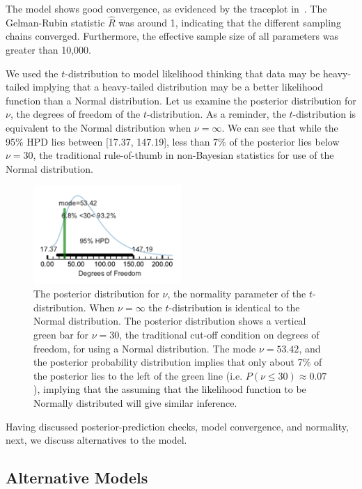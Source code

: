 The model shows good convergence, as evidenced by the traceplot in~. The Gelman-Rubin statistic $\hat{R}$ was around 1, indicating that the different sampling chains converged. Furthermore, the effective sample size of all parameters was greater than 10,000.

We used the $t$-distribution to model likelihood thinking that data may be heavy-tailed implying that a heavy-tailed distribution may be a better likelihood function than a  Normal distribution. Let us examine the posterior distribution for $\nu$, the degrees of freedom of the $t$-distribution. As a reminder, the $t$-distribution is equivalent to the Normal distribution when $\nu=\infty$. We can see that while the 95\% HPD lies between [17.37, 147.19], less than 7\% of the posterior lies below $\nu=30$, the traditional rule-of-thumb in non-Bayesian statistics for use of the Normal distribution.


\begin{figure}[htb]
    \includegraphics[width=0.5\textwidth]{./hari-code/robust_normality.pdf}
    \caption{The posterior distribution for $\nu$, the normality parameter of the $t$-distribution. When $\nu=\infty$ the $t$-distribution is identical to the Normal distribution. The posterior distribution shows a vertical green bar for $\nu=30$, the traditional cut-off condition on degrees of freedom, for using a Normal distribution. The mode $\nu=53.42$, and the posterior probability distribution implies that only about 7\% of the posterior lies to the left of the green line (i.e. $P(\nu \leq 30) \approx 0.07$), implying that the assuming that the likelihood function to be Normally distributed will give similar inference.}
    \label{fig:normality}
\end{figure}

Having discussed posterior-prediction checks, model convergence, and normality, next, we discuss alternatives to the model.

\subsection{Alternative Models}
\label{sub:Alternative Models}

